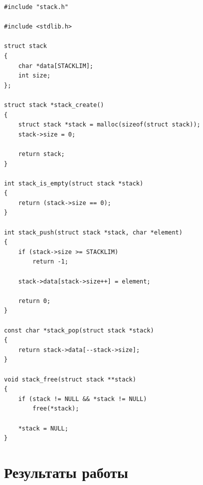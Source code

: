 \begin{lstlisting}[caption={Определение структуры стека и функций взаимодействия с ним}]
#include "stack.h"

#include <stdlib.h>

struct stack
{
    char *data[STACKLIM];
    int size;
};

struct stack *stack_create()
{
    struct stack *stack = malloc(sizeof(struct stack));
    stack->size = 0;

    return stack;
}

int stack_is_empty(struct stack *stack)
{
    return (stack->size == 0);
}

int stack_push(struct stack *stack, char *element)
{
    if (stack->size >= STACKLIM)
        return -1;

    stack->data[stack->size++] = element;

    return 0;
}

const char *stack_pop(struct stack *stack)
{
    return stack->data[--stack->size];
}

void stack_free(struct stack **stack)
{
    if (stack != NULL && *stack != NULL)
        free(*stack);

    *stack = NULL;
}
\end{lstlisting}

\section{Результаты работы}

